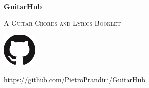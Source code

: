 
\begin{titlepage}
	\centering
	{\sffamily\huge\bfseries GuitarHub\par}
	{\ttfamily\scshape\Large A Guitar Chords and Lyrics Booklet\par}
	\includegraphics[scale=0.3]{img/GitHub-Mark-64px}\par %
	{\ttfamily\footnotesize https://github.com/PietroPrandini/GuitarHub\par}
\end{titlepage}
